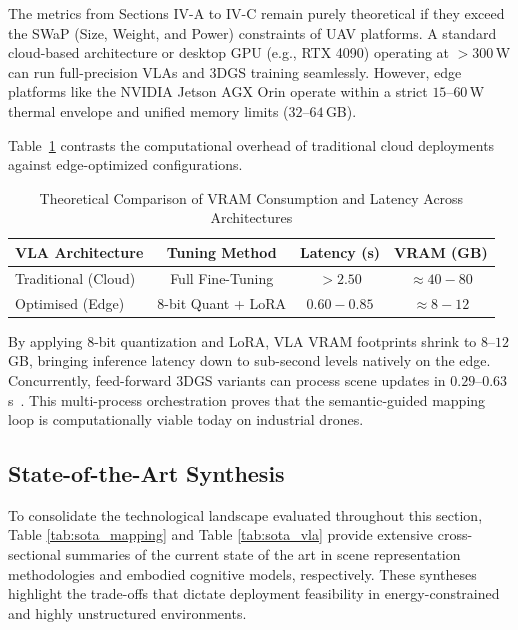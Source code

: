 \documentclass[conference]{IEEEtran}
\begin{document}
The metrics from Sections IV-A to IV-C remain purely theoretical if they exceed the SWaP (Size, Weight, and Power) constraints of UAV platforms. A standard cloud-based architecture or desktop GPU (e.g., RTX 4090) operating at $>300$\,W can run full-precision VLAs and 3DGS training seamlessly. However, edge platforms like the NVIDIA Jetson AGX Orin operate within a strict $15$--$60$\,W thermal envelope and unified memory limits ($32$--$64$\,GB).

Table~\ref{tab:vram_comparison} contrasts the computational overhead of traditional cloud deployments against edge-optimized configurations. 

\begin{table}[htbp]
	\centering
	\caption{Theoretical Comparison of VRAM Consumption and Latency Across Architectures}
	\label{tab:vram_comparison}
	\begin{tabular}{lccc}
		\toprule
		\textbf{VLA Architecture} & \textbf{Tuning Method} & \textbf{Latency (s)} & \textbf{VRAM (GB)} \\
		\midrule
		Traditional (Cloud) & Full Fine-Tuning & $> 2.50$ & $\approx 40 - 80$ \\ 
		Optimised (Edge) & 8-bit Quant + LoRA & $0.60 - 0.85$ & $\approx 8 - 12$ \\
		\bottomrule
	\end{tabular}
\end{table}

By applying 8-bit quantization and LoRA, VLA VRAM footprints shrink to $8$--$12$\,GB, bringing inference latency down to sub-second levels natively on the edge. Concurrently, feed-forward 3DGS variants can process scene updates in $0.29$--$0.63$\,s~\cite{li2025drivingforward}. This multi-process orchestration proves that the semantic-guided mapping loop is computationally viable today on industrial drones.

\subsection{State-of-the-Art Synthesis}
\label{subsec:sota_synthesis}

To consolidate the technological landscape evaluated throughout this section, Table \ref{tab:sota_mapping} and Table \ref{tab:sota_vla} provide extensive cross-sectional summaries of the current state of the art in scene representation methodologies and embodied cognitive models, respectively. These syntheses highlight the trade-offs that dictate deployment feasibility in energy-constrained and highly unstructured environments.
\end{document}
